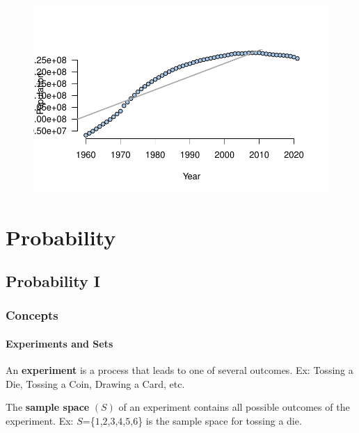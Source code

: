 \documentclass[
  letterpaper,
  DIV=11,
  numbers=noendperiod]{scrreprt}
\begin{document}
\begin{figure}[H]

{\centering \includegraphics{./08-RegressionII_files/figure-pdf/unnamed-chunk-28-1.pdf}

}

\end{figure}

\part{Probability}

\hypertarget{probability-i}{%
\chapter{Probability I}\label{probability-i}}

\hypertarget{concepts-7}{%
\section{Concepts}\label{concepts-7}}

\hypertarget{experiments-and-sets}{%
\subsection*{Experiments and Sets}\label{experiments-and-sets}}

An \textbf{experiment} is a process that leads to one of several
outcomes. Ex: Tossing a Die, Tossing a Coin, Drawing a Card, etc.

The \textbf{sample space} \((S)\) of an experiment contains all possible
outcomes of the experiment. Ex:
\(S\)=\{\(1\),\(2\),\(3\),\(4\),\(5\),\(6\)\} is the sample space for
tossing a die.
\end{document}
